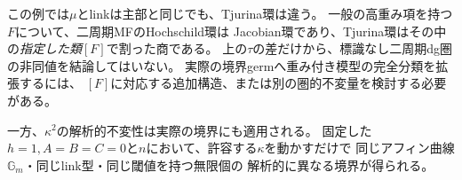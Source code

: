 \begin{remark}[比較の限界と次の問題]
この例では$\mu$とlinkは主部と同じでも、Tjurina環は違う。
一般の高重み項を持つ$F$について、二周期MFのHochschild環は
Jacobian環であり、Tjurina環はその中の\emph{指定した類}$[F]$で割った商である。
上の$\tau$の差だけから、標識なし二周期dg圏の非同値を結論してはいない。
実際の境界germへ重み付き模型の完全分類を拡張するには、
$[F]$に対応する追加構造、または別の圏的不変量を検討する必要がある。

一方、$\kappa^2$の解析的不変性は実際の境界にも適用される。
固定した$h=1,A=B=C=0$と$n$において、許容する$\kappa$を動かすだけで
同じアフィン曲線$\mathbb G_m$・同じlink型・同じ閾値を持つ無限個の
解析的に異なる境界が得られる。
\end{remark}
